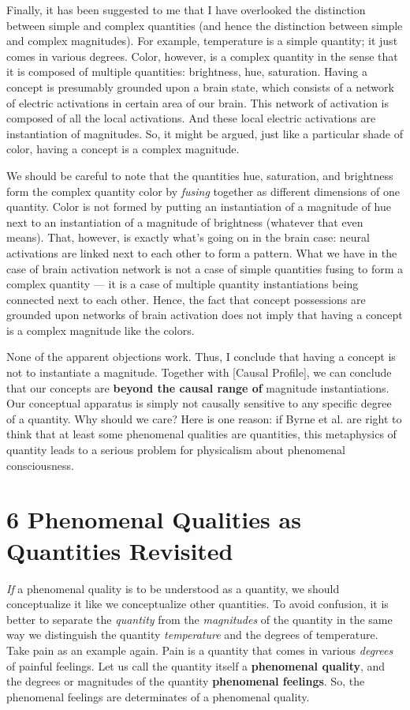 \documentclass[a4paper,12pt]{article}
\begin{document}
Finally, it has been suggested to me that I have overlooked the distinction between simple and complex quantities (and hence the distinction between simple and complex magnitudes). For example, temperature is a simple quantity; it just comes in various degrees. Color, however, is a complex quantity in the sense that it is composed of multiple quantities: brightness, hue, saturation. Having a concept is presumably grounded upon a brain state, which consists of a network of electric activations in certain area of our brain. This network of activation is composed of all the local activations. And these local electric activations are instantiation of magnitudes. So, it might be argued, just like a particular shade of color, having a concept is a complex magnitude. 

We should be careful to note that the quantities hue, saturation, and brightness form the complex quantity color by \emph{fusing} together as different dimensions of one quantity. Color is not formed by putting an instantiation of a magnitude of hue next to an instantiation of a magnitude of brightness (whatever that even means). That, however, is exactly what's going on in the brain case: neural activations are linked next to each other to form a pattern. What we have in the case of brain activation network is not a case of simple quantities fusing to form a complex quantity --- it is a case of multiple quantity instantiations being connected next to each other. Hence, the fact that concept possessions are grounded upon networks of brain activation does not imply that having a concept is a complex magnitude like the colors.

None of the apparent objections work. Thus, I conclude that having a concept is not to instantiate a magnitude. Together with [Causal Profile], we can conclude that our concepts are \textbf{beyond the causal range of} magnitude instantiations. Our conceptual apparatus is simply not causally sensitive to any specific degree of a quantity. Why should we care? Here is one reason: if Byrne et al. are right to think that at least some phenomenal qualities are quantities, this metaphysics of quantity leads to a serious problem for physicalism about phenomenal consciousness.

\section*{6 Phenomenal Qualities as Quantities Revisited}

\emph{If} a phenomenal quality is to be understood as a quantity, we should conceptualize it like we conceptualize other quantities. To avoid confusion, it is better to separate the \emph{quantity} from the \emph{magnitudes} of the quantity in the same way we distinguish the quantity \emph{temperature} and the degrees of temperature. Take pain as an example again. Pain is a quantity that comes in various \emph{degrees} of painful feelings. Let us call the quantity itself a \textbf{phenomenal quality}, and the degrees or magnitudes of the quantity \textbf{phenomenal feelings}. So, the phenomenal feelings are determinates of a phenomenal quality.
\end{document}
